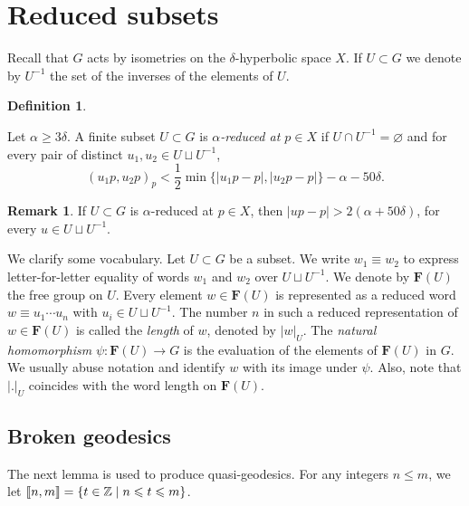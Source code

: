 \documentclass[leqno,a4paper,10pt]{amsart}
\theoremstyle{plain}
\theoremstyle{definition}
\newtheorem{df}[thm]{Definition}
\newtheorem{rem}[thm]{Remark}
\theoremstyle{remark}
\renewcommand{\geq}{\geqslant}
\newcommand{\F}{\mathbf{F}}
\let\geq\geqslant
\newcommand{\zinterval}[2]{
	\mathchoice%
	{\left \llbracket #1, \cdots, #2 \right \rrbracket}%
	{\llbracket #1, #2 \rrbracket}%
	{\llbracket #1, #2 \rrbracket}%
	{\llbracket #1, #2 \rrbracket}%
}
\begin{document}
\section{Reduced subsets}
\label{sec:reduced-subsets}

Recall that $G$ acts by isometries on the $\delta$-hyperbolic space $X$. If $U\subset G$ we denote by $U^{-1}$ the set of the inverses of the elements of $U$. 

\begin{df}	
	\label{df:reduced-subset}
	
	Let $\alpha \geq 3\delta$. A finite subset $U\subset G$ is \emph{$\alpha$-reduced at $p\in X$} if $U\cap U^{-1}=\varnothing$ and for every pair of distinct $u_1, u_2 \in U\sqcup U^{-1}$,
	$$
	(u_1p, u_2p)_p<\frac{1}{2}\min\{|u_1p-p|,|u_2p-p|\}-\alpha-50\delta.
	$$
	
\end{df}

\begin{rem}
\label{rem:reduced-subset}
If $U\subset G$ is $\alpha$-reduced at $p\in X$, then $|up-p|>2(\alpha+50\delta)$, for every $u\in U\sqcup U^{-1}$.
\end{rem}


We clarify some vocabulary. Let $U\subset G$ be a subset. We write $w_1\equiv w_2$ to express letter-for-letter equality of words $w_1$ and $w_2$ over $U\sqcup U^{-1}$. We denote by $\F(U)$ the free group on $U$. Every element $w\in \F(U)$ is represented as a reduced word $w\equiv u_1\cdots u_n$ with $u_i\in U\sqcup U^{-1}$. The number $n$ in such a reduced representation of $w\in \F(U)$ is called the \emph{length} of $w$, denoted by $|w|_U$. The \emph{natural homomorphism} $\psi\colon \F(U)\to G$ is the evaluation of the elements of $\F(U)$ in $G$. We usually abuse notation and identify $w$ with its image under $\psi$. 
Also, note that $|.|_U$ coincides with the word length on $\F(U)$. 

\subsection{Broken geodesics}

The next lemma is used to produce quasi-geodesics.  For any integers $n\leqslant m$, we let $\zinterval{n}{m}=\{t\in \mathbb{Z}\mid n\leqslant t\leqslant m\} $.  
\end{document}
